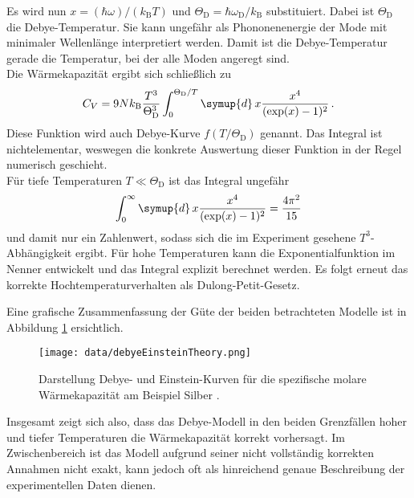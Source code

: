 Es wird nun $x = (\hbar \omega)/(k_\text{B} T)$ und $\Theta_\text{D} = \hbar \omega_\text{D} / k_\text{B}$ substituiert.
Dabei ist $\Theta_\text{D}$ die Debye-Temperatur. Sie kann ungefähr als Phononenenergie der Mode mit minimaler Wellenlänge interpretiert werden. Damit ist die Debye-Temperatur gerade die Temperatur, bei der alle Moden angeregt sind.\\
Die Wärmekapazität ergibt sich schließlich zu
\begin{equation}
  C_V = 9 N k_\text{B} \frac{T^3}{\Theta_\text{D}^3}\int_0^{\Theta_\text{D}/T} \symup{d}\,x \frac{x^4}{(\exp(x)-1)^2}\,.
  \label{eqn:cVDebye}
\end{equation}
Diese Funktion wird auch Debye-Kurve $f(T/\Theta_\text{D})$ genannt.
Das Integral ist nichtelementar, weswegen die konkrete Auswertung dieser Funktion in der Regel numerisch geschieht. \\
Für tiefe Temperaturen $T \ll \Theta_\text{D}$ ist das Integral ungefähr
\begin{equation}
  \int_0^{\infty} \symup{d}\,x \frac{x^4}{(\exp(x)-1)^2} = \frac{4\pi^2}{15}
  \label{eqn:theorieIntegral}
\end{equation}
und damit nur ein Zahlenwert, sodass sich die im Experiment gesehene $T^3$-Abhängigkeit ergibt. Für hohe Temperaturen kann die Exponentialfunktion im Nenner entwickelt und das Integral explizit berechnet werden. Es folgt erneut das korrekte Hochtemperaturverhalten als Dulong-Petit-Gesetz.

Eine grafische Zusammenfassung der Güte der beiden betrachteten Modelle ist in Abbildung \ref{fig:debyeEinstein} ersichtlich.

\begin{figure}
  \centering
  \texttt{[image: data/debyeEinsteinTheory.png]}
  \caption{Darstellung Debye- und Einstein-Kurven für die spezifische molare Wärmekapazität am Beispiel Silber \cite{debyeEinstein}.}
  \label{fig:debyeEinstein}
\end{figure}

Insgesamt zeigt sich also, dass das Debye-Modell in den beiden Grenzfällen hoher und tiefer Temperaturen die Wärmekapazität korrekt vorhersagt. Im Zwischenbereich ist das Modell aufgrund seiner nicht vollständig korrekten Annahmen nicht exakt, kann jedoch oft als hinreichend genaue Beschreibung der experimentellen Daten dienen.
